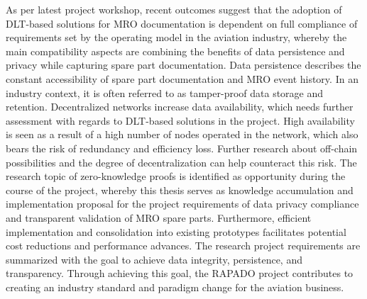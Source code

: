 \begin{comment}
- hier die Opremic slides einarbeiten
- die use cases definieren (Bastis part)
\end{comment}
    

As per latest project workshop, recent outcomes suggest that the adoption of DLT-based solutions for MRO documentation is dependent on full compliance of requirements set by the operating model in the aviation industry, whereby the main compatibility aspects are combining the benefits of data persistence and privacy while capturing spare part documentation. Data persistence describes the constant accessibility of spare part documentation and MRO event history. In an industry context, it is often referred to as tamper-proof data storage and retention. Decentralized networks increase data availability, which needs further assessment with regards to DLT-based solutions in the project. High availability is seen as a result of a high number of nodes operated in the network, which also bears the risk of redundancy and efficiency loss. Further research about off-chain possibilities and the degree of decentralization can help counteract this risk. The research topic of zero-knowledge proofs is identified as opportunity during the course of the project, whereby this thesis serves as knowledge accumulation and implementation proposal for the project requirements of data privacy compliance and transparent validation of MRO spare parts. Furthermore, efficient implementation and consolidation into existing prototypes facilitates potential cost reductions and performance advances. The research project requirements are summarized with the goal to achieve data integrity, persistence, and transparency. Through achieving this goal, the RAPADO project contributes to creating an industry standard and paradigm change for the aviation business.



